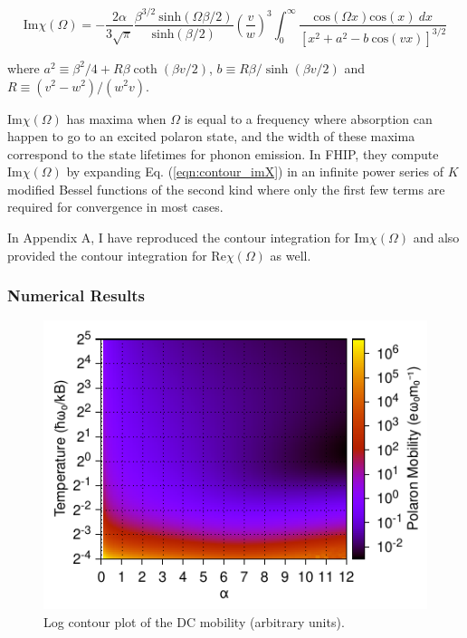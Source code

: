 \begin{equation}\label{eqn:contour_imX}
    \textrm{Im}\chi(\Omega) = - \frac{2 \alpha}{3 \sqrt{\pi}} \frac{\beta^{3/2}\ \textrm{sinh}(\Omega \beta / 2)}{\textrm{sinh}(\beta / 2)} \left( \frac{v}{w} \right)^3 \int_0^\infty \frac{\textrm{cos}(\Omega x) \textrm{cos}(x)\ dx}{\left[x^2 + a^2 - b\ \textrm{cos}(vx) \right]^{3/2}}
\end{equation}

where $a^2 \equiv \beta^2 / 4 + R \beta \coth (\beta v / 2)$, $b \equiv R\beta / \sinh(\beta v / 2)$ and $R \equiv (v^2 - w^2) / (w^2 v)$. 

$\text{Im} \chi(\Omega)$ has maxima when $\Omega$ is equal to a frequency where absorption can happen to go to an excited polaron state, and the width of these maxima correspond to the state lifetimes for phonon emission. In FHIP, they compute $\text{Im}\chi(\Omega)$ by expanding Eq. (\ref{eqn:contour_imX}) in an infinite power series of $K$ modified Bessel functions of the second kind where only the first few terms are required for convergence in most cases.  

In Appendix A, I have reproduced the contour integration for $\text{Im}\chi(\Omega)$ and also provided the contour integration for $\text{Re}\chi(\Omega)$ as well.

\subsubsection{Numerical Results}

\begin{figure}[t]
    \centering
    \includegraphics[width=.7\textwidth]{chapters/literature/figures/frohlich-3d-mobility-temp-00625to32-contourf-COLOUR.pdf}
    \caption{Log contour plot of the DC mobility (arbitrary units).}
    \label{fig:dcmobility}
\end{figure}

